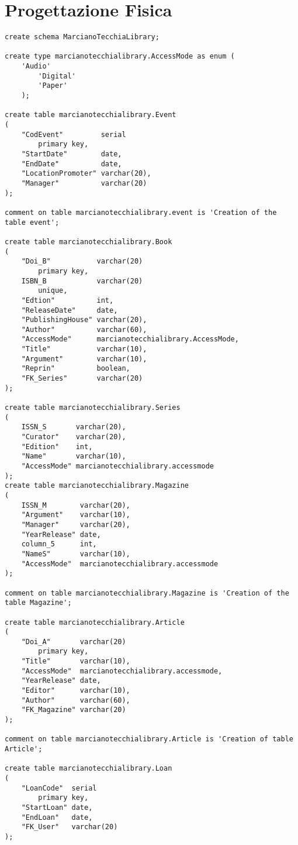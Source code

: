 \chapter{Progettazione Fisica}

\begin{lstlisting}
create schema MarcianoTecchiaLibrary;

create type marcianotecchialibrary.AccessMode as enum (
    'Audio'
        'Digital'
        'Paper'
    );

create table marcianotecchialibrary.Event
(
    "CodEvent"         serial
        primary key,
    "StartDate"        date,
    "EndDate"          date,
    "LocationPromoter" varchar(20),
    "Manager"          varchar(20)
);

comment on table marcianotecchialibrary.event is 'Creation of the table event';

create table marcianotecchialibrary.Book
(
    "Doi_B"           varchar(20)
        primary key,
    ISBN_B            varchar(20)
        unique,
    "Edtion"          int,
    "ReleaseDate"     date,
    "PublishingHouse" varchar(20),
    "Author"          varchar(60),
    "AccessMode"      marcianotecchialibrary.AccessMode,
    "Title"           varchar(10),
    "Argument"        varchar(10),
    "Reprin"          boolean,
    "FK_Series"       varchar(20)
);

create table marcianotecchialibrary.Series
(
    ISSN_S       varchar(20),
    "Curator"    varchar(20),
    "Edition"    int,
    "Name"       varchar(10),
    "AccessMode" marcianotecchialibrary.accessmode
);
create table marcianotecchialibrary.Magazine
(
    ISSN_M        varchar(20),
    "Argument"    varchar(10),
    "Manager"     varchar(20),
    "YearRelease" date,
    column_5      int,
    "NameS"       varchar(10),
    "AccessMode"  marcianotecchialibrary.accessmode
);

comment on table marcianotecchialibrary.Magazine is 'Creation of the table Magazine';

create table marcianotecchialibrary.Article
(
    "Doi_A"       varchar(20)
        primary key,
    "Title"       varchar(10),
    "AccessMode"  marcianotecchialibrary.accessmode,
    "YearRelease" date,
    "Editor"      varchar(10),
    "Author"      varchar(60),
    "FK_Magazine" varchar(20)
);

comment on table marcianotecchialibrary.Article is 'Creation of table Article';

create table marcianotecchialibrary.Loan
(
    "LoanCode"  serial
        primary key,
    "StartLoan" date,
    "EndLoan"   date,
    "FK_User"   varchar(20)
);


\end{lstlisting}
